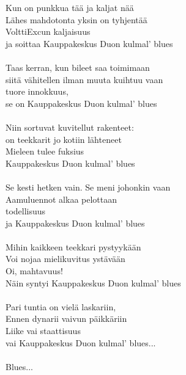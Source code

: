 Kun on punkkua tää ja kaljat nää \\
Lähes mahdotonta yksin on tyhjentää \\
VolttiExcun kaljaisuus \\
ja soittaa Kauppakeskus Duon kulmal' blues \\
\hspace{10mm} \\
Taas kerran, kun bileet saa toimimaan \\
siitä vähitellen ilman muuta kuihtuu vaan \\
tuore innokkuus, \\
se on Kauppakeskus Duon kulmal' blues \\ 
\hspace{10mm} \\
Niin sortuvat kuvitellut rakenteet: \\
on teekkarit jo kotiin lähteneet \\
Mieleen tulee fuksius \\
Kauppakeskus Duon kulmal' blues \\
\hspace{10mm} \\
Se kesti hetken vain. Se meni johonkin vaan \\
Aamuluennot alkaa pelottaan \\
todellisuus \\
ja Kauppakeskus Duon kulmal' blues \\
\hspace{10mm} \\
Mihin kaikkeen teekkari pystyykään \\
Voi nojaa mielikuvitus ystävään \\
Oi, mahtavuus! \\
Näin syntyi Kauppakeskus Duon kulmal' blues \\
\hspace{10mm} \\
Pari tuntia on vielä laskariin, \\
Ennen dynarii vaivun päikkäriin \\
Liike vai staattisuus \\
vai Kauppakeskus Duon kulmal' blues... \\
\hspace{10mm} \\
Blues... \\